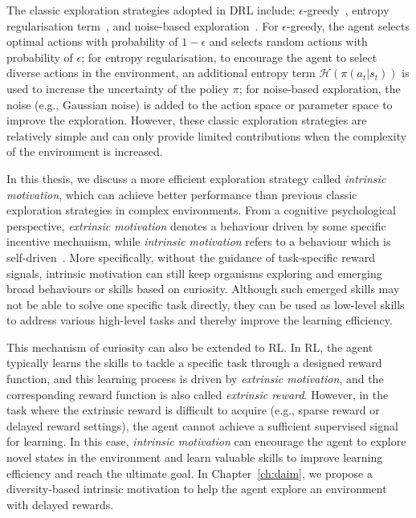 The classic exploration strategies adopted in DRL include: $\epsilon$-greedy~\cite{mnih2015human,wang2016dueling}, entropy regularisation term~\cite{mnih2016asynchronous,schulman2017proximal,schulman2015trust}, and noise-based exploration~\cite{lillicrap2015continuous,plappert2018parameter,fortunato2018noisy}. For $\epsilon$-greedy, the agent selects optimal actions with probability of $1-\epsilon$ and selects random actions with probability of $\epsilon$; for entropy regularisation, to encourage the agent to select diverse actions in the environment, an additional entropy term $\mathcal{H}(\pi(a_{t}|s_{t}))$ is used to increase the uncertainty of the policy $\pi$; for noise-based exploration, the noise (e.g., Gaussian noise) is added to the action space or parameter space to improve the exploration. However, these classic exploration strategies are relatively simple and can only provide limited contributions when the complexity of the environment is increased.

In this thesis, we discuss a more efficient exploration strategy called \textit{intrinsic motivation}, which can achieve better performance than previous classic exploration strategies in complex environments. From a cognitive psychological perspective, \textit{extrinsic motivation} denotes a behaviour driven by some specific incentive mechanism, while \textit{intrinsic motivation} refers to a behaviour which is self-driven~\cite{singh2005intrinsically}. More specifically, without the guidance of task-specific reward signals, intrinsic motivation can still keep organisms exploring and emerging broad behaviours or skills based on curiosity. Although such emerged skills may not be able to solve one specific task directly, they can be used as low-level skills to address various high-level tasks and thereby improve the learning efficiency. 

This mechanism of curiosity can also be extended to RL. In RL, the agent typically learns the skills to tackle a specific task through a designed reward function, and this learning process is driven by \textit{extrinsic motivation}, and the corresponding reward function is also called \textit{extrinsic reward}. However, in the task where the extrinsic reward is difficult to acquire (e.g., sparse reward or delayed reward settings), the agent cannot achieve a sufficient supervised signal for learning. In this case, \textit{intrinsic motivation} can encourage the agent to explore novel states in the environment and learn valuable skills to improve learning efficiency and reach the ultimate goal. In Chapter~\ref{ch:daim}, we propose a diversity-based intrinsic motivation to help the agent explore an environment with delayed rewards.

